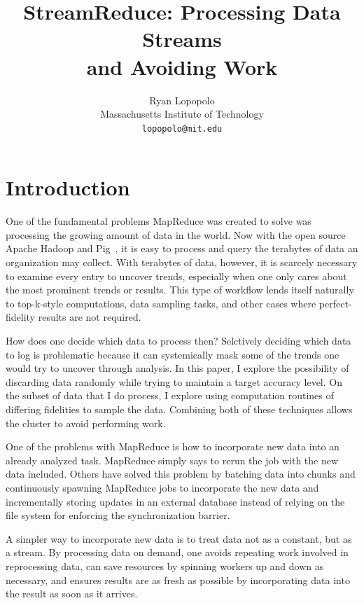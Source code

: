 \documentclass[12pt,twocolumn]{article}
\title{StreamReduce: Processing Data Streams\\and Avoiding Work}
\author{Ryan Lopopolo\\
Massachusetts Institute of Technology\\
\texttt{lopopolo@mit.edu}}
\begin{document}
\maketitle

\section{Introduction}
\label{sec:intro}
One of the fundamental problems MapReduce was created to solve was processing
the growing amount of data in the world. Now with the open source Apache Hadoop
and Pig~\cite{Olston:2008:PLN:1376616.1376726}, it is easy to process and query
the terabytes of data an organization
may collect. With terabytes of data, however, it is scarcely necessary to examine
every entry to uncover trends, especially when one only cares about the most prominent
trends or results. This type of workflow lends itself naturally to top-k-style computations,
data sampling tasks, and other cases where perfect-fidelity results are not required.

How does one decide which data to process then? Selctively deciding which data to
log is problematic because it can systemically mask some of the trends one would
try to uncover through analysis. In this paper, I explore the possibility of
discarding data randomly while trying to maintain a target accuracy level.
On the subset of data that I do process, I explore using
computation routines of differing fidelities to sample the data. Combining both of these
techniques allows the cluster to avoid performing work.

One of the problems with MapReduce is how to
incorporate new data into an already analyzed task. MapReduce simply says to rerun
the job with the new data included. Others have solved this problem by batching data
into chunks and continuously spawning MapReduce jobs to incorporate the new data
and incrementally storing updates in an external database instead of relying on
the file system for enforcing the synchronization barrier.

A simpler way to incorporate new data is to treat data not as a constant, but as a
stream. By processing data on demand, one avoids repeating work involved in reprocessing
data, can save resources
by spinning workers up and down as necessary, and ensures results are as fresh as possible
by incorporating data into the result as soon as it arrives.
\end{document}
